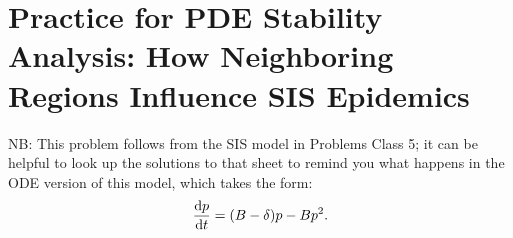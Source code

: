 \documentclass[a4paper,12pt]{article}
\begin{document}
 
%
\newcommand{\sol}[1]{}

\section{Practice for PDE Stability Analysis: How Neighboring Regions Influence SIS Epidemics}
NB: This problem follows from the SIS model in Problems Class 5; it can be helpful to look up the solutions to that sheet to remind you what happens in the ODE version of this model, which takes the form:
\begin{equation*}
    \fd{p}{t} = (B-\delta)p - Bp^2.
\end{equation*}
\end{document}
